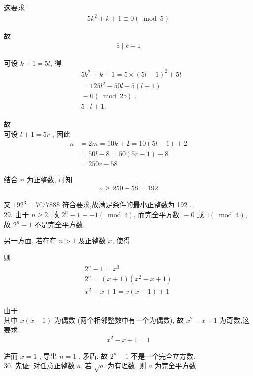 这要求
\begin{align*}
	5 k^{2}+k+1 \equiv 0(\bmod 5)
\end{align*}

故
\begin{align*}
	5 \mid k+1
\end{align*}

可设 $k+1=5 l$, 得\begin{align}
	 & 5 k^{2}+k+1=5 \times(5 l-1)^{2}+5 l \\
	 & =125 l^{2}-50 l+5(l+1)              \\
	 & \equiv 0(\bmod 25) \text { ,  }     \\
	 & 5 \mid l+1 \text {. }
\end{align}

故\\
可设 $l+1=5 r$ , 因此\begin{align}
	n & =2 m=10 k+2=10(5 l-1)+2 \\
	  & =50 l-8=50(5 r-1)-8     \\
	  & =250 r-58
\end{align}

结合 $n$ 为正整数, 可知
\begin{align*}
	n \geqslant 250-58=192
\end{align*}

又 $192^{3}=7077888$ 符合要求,故满足条件的最小正整数为 192 .\\
29. 由于 $n \geqslant 2$, 故 $2^{n}-1 \equiv-1(\bmod 4)$, 而完全平方数 $\equiv 0$ 或 $1(\bmod 4)$,故 $2^{n}-1$ 不是完全平方数.

另一方面, 若存在 $n>1$ 及正整数 $x$, 使得

则
\begin{align*}
	\begin{gathered}
		2^{n}-1=x^{3} \\
		2^{n}=(x+1)\left(x^{2}-x+1\right) \\
		x^{2}-x+1=x(x-1)+1
	\end{gathered}
\end{align*}

由于\\
其中 $x(x-1)$ 为偶数 (两个相邻整数中有一个为偶数), 故 $x^{2}-x+1$ 为奇数,这要求
\begin{align*}
	x^{2}-x+1=1
\end{align*}

进而 $x=1$ , 导出 $n=1$ , 矛盾. 故 $2^{n}-1$ 不是一个完全立方数.\\
30. 先证: 对任意正整数 $a$, 若 $\sqrt{a}$ 为有理数, 则 $a$ 为完全平方数.

